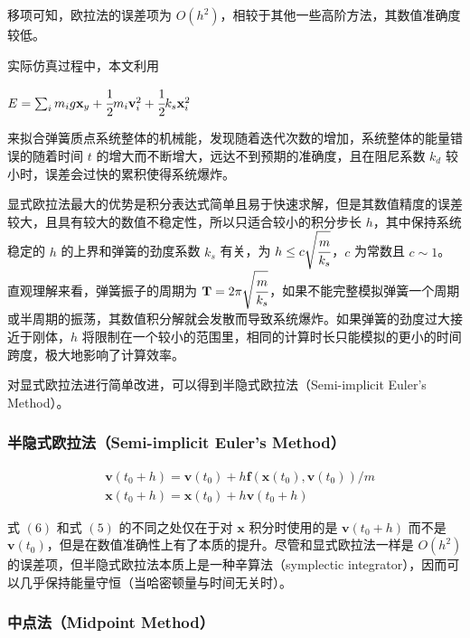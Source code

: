\documentclass[UTF8]{ctexart}
\begin{document}
移项可知，欧拉法的误差项为 $O(h^2)$，相较于其他一些高阶方法，其数值准确度较低。 \par

实际仿真过程中，本文利用 \begin{large} $E = \sum_{i} m_ig\mathbf{x}_y + \cfrac{1}{2} m_i \mathbf{v}_{i}^{2} + \cfrac{1}{2} k_s \mathbf{x}_{i}^{2}$ \end{large} 来拟合弹簧质点系统整体的机械能，发现随着迭代次数的增加，系统整体的能量错误的随着时间 $t$ 的增大而不断增大，远达不到预期的准确度，且在阻尼系数 $k_d$ 较小时，误差会过快的累积使得系统爆炸。

显式欧拉法最大的优势是积分表达式简单且易于快速求解，但是其数值精度的误差较大，且具有较大的数值不稳定性，所以只适合较小的积分步长 $h$，其中保持系统稳定的 $h$ 的上界和弹簧的劲度系数 $k_s$ 有关，为 $h \le c \sqrt{\cfrac{m}{k_s}}$，$c$ 为常数且 $c \sim 1$。直观理解来看，弹簧振子的周期为 $\mathbf{T} = 2 \pi \sqrt{\cfrac{m}{k_s}}$，如果不能完整模拟弹簧一个周期或半周期的振荡，其数值积分解就会发散而导致系统爆炸。如果弹簧的劲度过大接近于刚体，$h$ 将限制在一个较小的范围里，相同的计算时长只能模拟的更小的时间跨度，极大地影响了计算效率。 \par

对显式欧拉法进行简单改进，可以得到半隐式欧拉法（Semi-implicit Euler's Method）。

\subsubsection{半隐式欧拉法（Semi-implicit Euler's Method）}

\begin{large}
\begin{equation}
\begin{split}
& \mathbf{v}(t_0 + h) = \mathbf{v}(t_0) + h \mathbf{f}(\mathbf{x}(t_0), \mathbf{v}(t_0)) / m \\
& \mathbf{x}(t_0 + h) = \mathbf{x}(t_0) + h \mathbf{v} (t_0 + h)
\end{split}
\end{equation}
\end{large}

式 $(6)$ 和式 $(5)$ 的不同之处仅在于对 $\mathbf{x}$ 积分时使用的是 $\mathbf{v} (t_0 + h)$ 而不是 $\mathbf{v} (t_0)$，但是在数值准确性上有了本质的提升。尽管和显式欧拉法一样是 $O(h^2)$ 的误差项，但半隐式欧拉法本质上是一种辛算法（symplectic integrator），因而可以几乎保持能量守恒（当哈密顿量与时间无关时）。

\subsubsection{中点法（Midpoint Method）}
\end{document}
